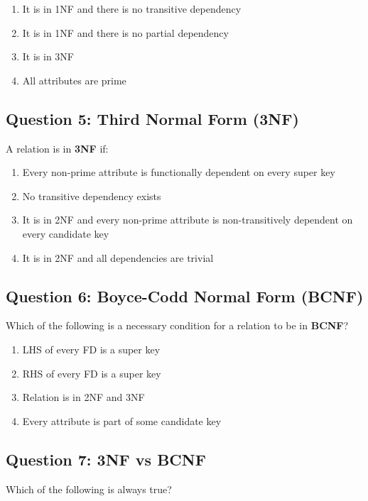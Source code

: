\begin{enumerate}[label=(\alph*)]
    \item It is in 1NF and there is no transitive dependency
    \item It is in 1NF and there is no partial dependency
    \item It is in 3NF
    \item All attributes are prime
\end{enumerate}

\vspace{1em}

\subsection*{Question 5: Third Normal Form (3NF)}
A relation is in \textbf{3NF} if:

\begin{enumerate}[label=(\alph*)]
    \item Every non-prime attribute is functionally dependent on every super key
    \item No transitive dependency exists
    \item It is in 2NF and every non-prime attribute is non-transitively dependent on every candidate key
    \item It is in 2NF and all dependencies are trivial
\end{enumerate}

\vspace{1em}

\subsection*{Question 6: Boyce-Codd Normal Form (BCNF)}
Which of the following is a necessary condition for a relation to be in \textbf{BCNF}?

\begin{enumerate}[label=(\alph*)]
    \item LHS of every FD is a super key
    \item RHS of every FD is a super key
    \item Relation is in 2NF and 3NF
    \item Every attribute is part of some candidate key
\end{enumerate}

\vspace{1em}

\subsection*{Question 7: 3NF vs BCNF}
Which of the following is always true?


